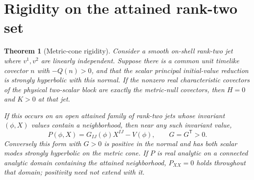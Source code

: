\documentclass[11pt]{article}
\newtheorem{theorem}{Theorem}[section]
\begin{document}
\section{Rigidity on the attained rank-two set}
\begin{theorem}[Metric-cone rigidity]\label{thm:rigid}
Consider a smooth on-shell rank-two jet where \(v^1,v^2\) are linearly independent. Suppose there is a common unit timelike covector \(n\) with \(-Q(n)>0\), and that the scalar principal initial-value reduction is strongly hyperbolic with this normal. If the nonzero real characteristic covectors of the physical two-scalar block are exactly the metric-null covectors, then \(H=0\) and \(K>0\) at that jet.

If this occurs on an open attained family of rank-two jets whose invariant \((\phi,X)\) values contain a neighborhood, then near any such invariant value,
\[
 P(\phi,X)=G_{IJ}(\phi)X^{IJ}-V(\phi),\qquad G=G^{\mathsf T}>0 .
\]
Conversely this form with \(G>0\) is positive in the normal and has both scalar modes strongly hyperbolic on the metric cone. If \(P\) is real analytic on a connected analytic domain containing the attained neighborhood, \(P_{XX}=0\) holds throughout that domain; positivity need not extend with it.
\end{theorem}
\end{document}
